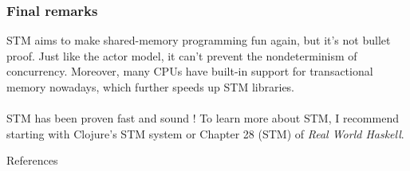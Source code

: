 \documentclass{beamer}
\theoremstyle{plain}
\begin{document}
\begin{frame}
  \frametitle{Final remarks}
  STM aims to make shared-memory programming fun again, but it's not bullet proof. Just like the actor model, it can't
  prevent the nondeterminism of concurrency. Moreover, many CPUs have built-in support for transactional memory nowadays,
  which further speeds up STM libraries.\\~\\

  STM has been proven fast and sound \cite{stmtoy}! To learn more about STM, I recommend starting with Clojure's STM system or
  Chapter 28 (STM) of \textit{Real World Haskell}.
\end{frame}

\begin{frame}[allowframebreaks]{References}
\def\newblock{}


\end{frame}
\end{document}
